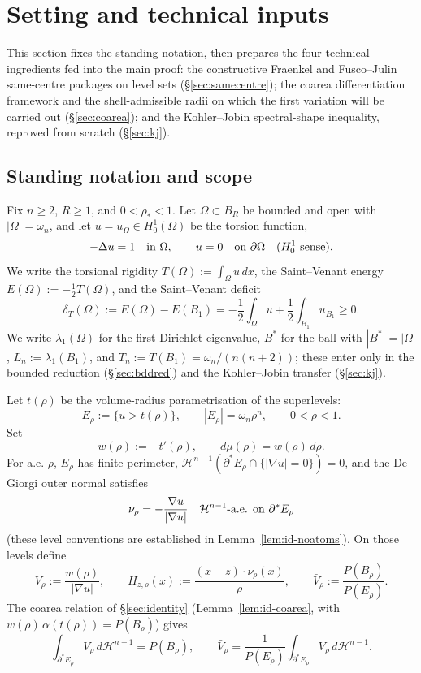 \documentclass[11pt]{amsart}
\theoremstyle{definition}
\newcommand{\Om}{\Omega}
\newcommand{\dT}{\delta_T}
\newcommand{\rstar}{\rho_*}
\newcommand{\wt}{w}
\newcommand{\Hn}{\mathcal H^{n-1}}
\newcommand{\Per}{P}
\newcommand{\Bstar}{B^*}
\begin{document}
\section{Setting and technical inputs}\label{sec:preliminaries}

This section fixes the standing notation, then prepares the four
technical ingredients fed into the main proof: the constructive Fraenkel
and Fusco--Julin same-centre packages on level sets
(\S\ref{sec:samecentre}); the coarea differentiation framework and the
shell-admissible radii on which the first variation will be carried out
(\S\ref{sec:coarea}); and the Kohler--Jobin spectral-shape inequality,
reproved from scratch (\S\ref{sec:kj}).

\subsection{Standing notation and scope}\label{sec:notation}

Fix \(n\ge2\), \(R\ge1\), and \(0<\rstar<1\).  Let
\(\Om\subset B_R\) be bounded and open with \(|\Om|=\omega_n\), and let
\(u=u_\Om\in H^1_0(\Om)\) be the torsion function,
\[
   -\Delta u=1\quad\hbox{in }\Om,\qquad u=0\quad\hbox{on }\partial\Om
   \quad(H^1_0\hbox{ sense}).
\]
We write the torsional rigidity \(T(\Om):=\int_\Om u\,dx\), the Saint--Venant
energy \(E(\Om):=-\tfrac12 T(\Om)\), and the Saint--Venant deficit
\[
   \dT(\Om):=E(\Om)-E(B_1)
   =-\frac12\int_\Om u+\frac12\int_{B_1}u_{B_1}\ge0.
\]
We write \(\lambda_1(\Om)\) for the first Dirichlet eigenvalue, \(\Bstar\) for
the ball with \(|\Bstar|=|\Om|\), \(L_n:=\lambda_1(B_1)\), and
\(T_n:=T(B_1)=\omega_n/(n(n+2))\); these enter only in the bounded reduction
(\S\ref{sec:bddred}) and the Kohler--Jobin transfer (\S\ref{sec:kj}).

Let \(t(\rho)\) be the volume-radius parametrisation of the superlevels:
\[
   E_\rho:=\{u>t(\rho)\},\qquad |E_\rho|=\omega_n\rho^n,
   \qquad 0<\rho<1.
\]
Set
\[
   \wt(\rho):=-t'(\rho),\qquad d\mu(\rho)=\wt(\rho)\,d\rho.
\]
For a.e. \(\rho\), \(E_\rho\) has finite perimeter, \(\Hn(\partial^*E_\rho
\cap\{|\nabla u|=0\})=0\), and the De Giorgi outer normal satisfies
\[
   \nu_\rho=-\frac{\nabla u}{|\nabla u|}
   \quad\Hn\hbox{-a.e. on }\partial^*E_\rho
\]
(these level conventions are established in
Lemma~\ref{lem:id-noatoms}).  On those levels define
\[
   V_\rho:=\frac{\wt(\rho)}{|\nabla u|},\qquad
   H_{z,\rho}(x):=\frac{(x-z)\cdot\nu_\rho(x)}{\rho},\qquad
   \bar V_\rho:=\frac{\Per(B_\rho)}{\Per(E_\rho)}.
\]
The coarea relation of \S\ref{sec:identity}
(Lemma~\ref{lem:id-coarea}, with \(\wt(\rho)\,\alpha(t(\rho))=\Per(B_\rho)\))
gives
\begin{equation}\label{eq:V-mean}
   \int_{\partial^*E_\rho} V_\rho\,d\Hn=\Per(B_\rho),
   \qquad
   \bar V_\rho=\frac1{\Per(E_\rho)}
       \int_{\partial^*E_\rho}V_\rho\,d\Hn .
\end{equation}
\end{document}
